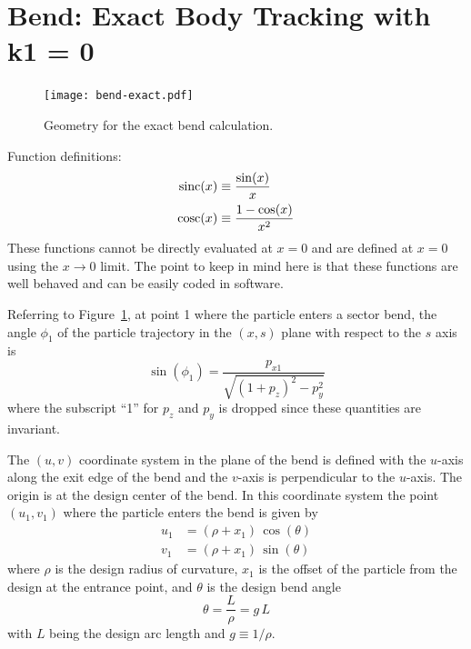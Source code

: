 \newpage  %

\section{Bend: Exact Body Tracking with k1 = 0}
\label{s:bend.body.std}

\begin{figure}[h]
  \centering
  \texttt{[image: bend-exact.pdf]}
  \caption{Geometry for the exact bend calculation.}
  \label{f:bend.exact}
\end{figure}


Function definitions:
\begin{align}
  \text{sinc}(x) &\equiv \frac{\sin(x)}{x} \\
  \text{cosc}(x) &\equiv \frac{1 - \cos(x)}{x^2}
\end{align}
These functions cannot be directly evaluated at $x = 0$ and are defined at $x = 0$ using the $x
\rightarrow 0$ limit. The point to keep in mind here is that these functions are well behaved and
can be easily coded in software.

Referring to Figure~\ref{f:bend.exact}, at point 1 where the particle enters a sector bend, the angle
$\phi_1$ of the particle trajectory in the $(x,s)$ plane with respect to the $s$ axis is
\begin{equation}
  \sin(\phi_1) = \frac{p_{x1}}{\sqrt{(1+p_z)^2 - p_y^2}}
\end{equation}
where the subscript ``1'' for $p_z$ and $p_y$ is dropped since these quantities are invariant.

The $(u,v)$ coordinate system in the plane of the bend is defined with the $u$-axis along the exit
edge of the bend and the $v$-axis is perpendicular to the $u$-axis. The origin is at the design
center of the bend. In this coordinate system the point $(u_1, v_1)$ where the particle enters the
bend is given by
\begin{align}
  u_1 &= (\rho + x_1) \, \cos(\theta) \\
  v_1 &= (\rho + x_1) \, \sin(\theta)
\end{align}
where $\rho$ is the design radius of curvature, $x_1$ is the offset of the particle from the design
at the entrance point, and $\theta$ is the design bend angle
\begin{equation}
  \theta = \frac{L}{\rho} = g \, L
\end{equation}
with $L$ being the design arc length and $g \equiv 1/\rho$.

